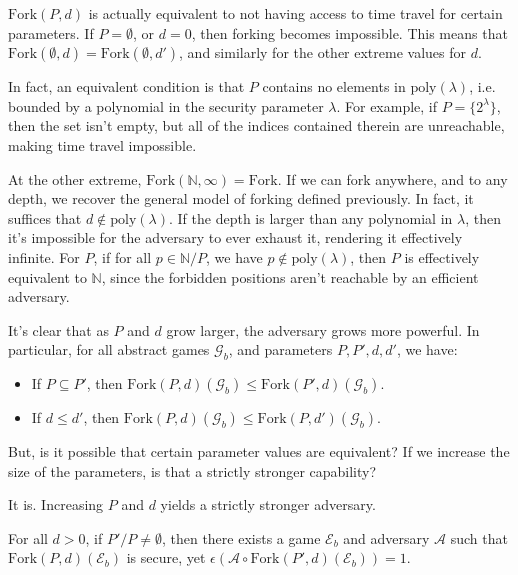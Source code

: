 $\text{Fork}(P, d)$ is actually equivalent to not having access
to time travel for certain parameters.
If $P = \emptyset$, or $d = 0$, then forking becomes
impossible.
This means that $\text{Fork}(\emptyset, d) = \text{Fork}(\emptyset, d')$,
and similarly for the other extreme values for $d$.

In fact, an equivalent condition is that $P$ contains no elements
in $\text{poly}(\lambda)$, i.e. bounded by a polynomial in the security
parameter $\lambda$.
For example, if $P = \{2^\lambda\}$, then the set isn't empty, but all
of the indices contained therein are unreachable, making time travel impossible.

At the other extreme, $\text{Fork}(\mathbb{N}, \infty) = \text{Fork}$.
If we can fork anywhere, and to any depth, we recover the general
model of forking defined previously.
In fact, it suffices that $d \notin \text{poly}(\lambda)$.
If the depth is larger than any polynomial in $\lambda$,
then it's impossible for the adversary to ever exhaust it, rendering
it effectively infinite.
For $P$, if for all $p \in \mathbb{N} / P$, we have $p \notin \text{poly}(\lambda)$,
then $P$ is effectively equivalent to $\mathbb{N}$, since the forbidden
positions aren't reachable by an efficient adversary.

It's clear that as $P$ and $d$ grow larger, the adversary grows
more powerful.
In particular, for all abstract games $\mathcal{G}_b$, and parameters
$P, P', d, d'$, we have:

\begin{itemize}
    \item If $P \subseteq P'$, then $\text{Fork}(P, d)(\mathcal{G}_b) \leq \text{Fork}(P', d)(\mathcal{G}_b)$.
    \item If $d \leq d'$, then $\text{Fork}(P, d)(\mathcal{G}_b) \leq \text{Fork}(P, d')(\mathcal{G}_b)$.
\end{itemize}

But, is it possible that certain parameter values are equivalent?
If we increase the size of the parameters, is that a strictly stronger
capability?

It is.
Increasing $P$ and $d$ yields a strictly stronger adversary.

\begin{claim}
    \label{claim:P-is-stronger}
    For all $d > 0$, if $P' / P \neq \emptyset$, then there exists a
    game $\mathcal{E}_b$ and adversary $\mathcal{A}$ such that 
    $\text{Fork}(P, d)(\mathcal{E}_b)$ is secure, yet $\epsilon(\mathcal{A} \circ \text{Fork}(P', d)(\mathcal{E}_b)) = 1$.
\end{claim}

